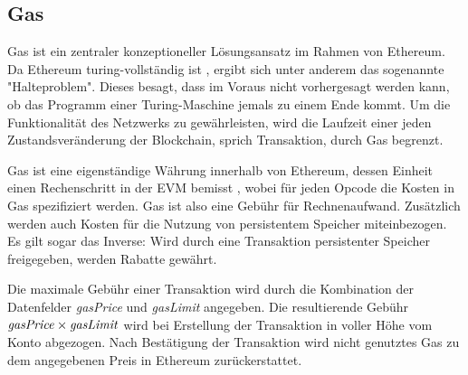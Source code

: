\documentclass[runningheads]{llncs}
\begin{document}


\subsection{Gas}
\label{gas}
Gas ist ein zentraler konzeptioneller Lösungsansatz im Rahmen von Ethereum. Da Ethereum turing-vollständig ist \cite[S. 1]{wood_ethereum/yellowpaper_2019}, ergibt sich unter anderem das sogenannte "Halteproblem". Dieses besagt, dass im Voraus nicht vorhergesagt werden kann, ob das Programm einer Turing-Maschine jemals zu einem Ende kommt. \cite[S.70]{davis_computability_2013} Um die Funktionalität des Netzwerks zu gewährleisten, wird die Laufzeit einer jeden Zustandsveränderung der Blockchain, sprich Transaktion, durch Gas begrenzt.

Gas ist eine eigenständige Währung innerhalb von Ethereum, dessen Einheit einen Rechenschritt in der EVM bemisst \cite[S. 9:3]{m.spain_oasics-tokeneconomics_2019}, wobei für jeden Opcode die Kosten in Gas spezifiziert werden. \cite[S. 25 ff.]{wood_ethereum/yellowpaper_2019} Gas ist also eine Gebühr für Rechnenaufwand. Zusätzlich werden auch Kosten für die Nutzung von persistentem Speicher miteinbezogen. Es gilt sogar das Inverse: Wird durch eine Transaktion persistenter Speicher freigegeben, werden Rabatte gewährt.

Die maximale Gebühr einer Transaktion wird durch die Kombination der Datenfelder \textit{gasPrice} und \textit{gasLimit} angegeben. Die resultierende Gebühr $ \text{\textit{gasPrice}} \times \text{\textit{gasLimit}} $ wird bei Erstellung der Transaktion in voller Höhe vom Konto abgezogen. Nach Bestätigung der Transaktion wird nicht genutztes Gas zu dem angegebenen Preis in Ethereum zurückerstattet.
\end{document}
